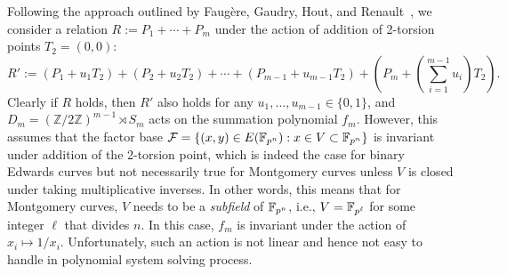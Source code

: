 Following the approach outlined by Faug\`ere, Gaudry, Hout, and
Renault~\cite{DBLP:conf/eurocrypt/FaugereHJRV14}, we consider a
relation $R:=P_1+\cdots+P_m$ under the action of addition of 2-torsion
points $T_2=(0,0)$:
\[ R' :=
  (P_1+u_1T_2)+(P_2+u_2T_2)+\cdots+(P_{m-1}+u_{m-1}T_2)+\left(P_m+\left(\sum_{i=1}^{m-1}u_i\right)T_2\right). \]
%
Clearly if $R$ holds, then $R'$ also holds for any
$u_1,\ldots,u_{m-1}\in\{0,1\}$, and
$D_m=(\mathbb{Z}/2\mathbb{Z})^{m-1}\rtimes S_m$ acts on the summation
polynomial $f_m$.
%
However, this assumes that the factor base
$\mathcal F=\{(x,y)\in E(\mathbb F_{p^n}):x\in V\subset\mathbb F_{p^n}\}$ is invariant
under addition of the 2-torsion point, which is indeed the case for
binary Edwards curves but not necessarily true for Montgomery curves
unless $V$ is closed under taking multiplicative inverses.
%
In other words, this means that for Montgomery curves, $V$ needs to be
a \emph{subfield} of $\mathbb F_{p^n}$, i.e., $V=\mathbb F_{p^\ell}$ for some integer
$\ell$ that divides $n$.
%
In this case, $f_m$ is invariant under the action of
$x_i\mapsto 1/x_i$.
%
Unfortunately, such an action is not linear and hence not easy to
handle in polynomial system solving process.

